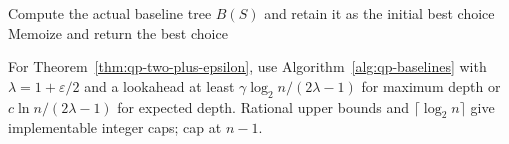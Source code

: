 \begin{algorithm}[H]
\caption{\Rollout: exact initial-tree optimization with a baseline}
\label{alg:rollout}
Compute the actual baseline tree $B(S)$ and retain it as the initial best choice\;
Memoize and return the best choice\;
\end{algorithm}

For Theorem~\ref{thm:qp-two-plus-epsilon}, use Algorithm~\ref{alg:qp-baselines}
with $\lambda=1+\varepsilon/2$ and a lookahead at least
$\gamma\log_2 n/(2\lambda-1)$ for maximum depth or
$c\ln n/(2\lambda-1)$ for expected depth. Rational upper bounds and
$\lceil\log_2 n\rceil$ give implementable integer caps; cap at $n-1$.
